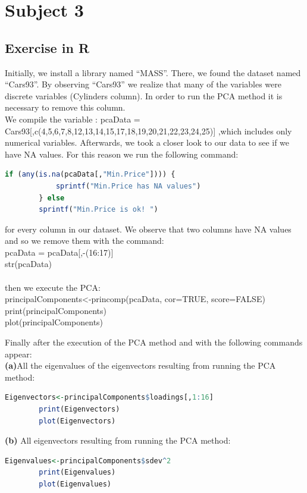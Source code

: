 \documentclass[10pt,a4paper]{article}
\begin{document}
	\section{Subject 3}
	\subsection{Exercise in R}
	Initially, we install a library named “MASS”. There, we found the dataset named “Cars93”. By observing “Cars93” we realize that many of the variables were discrete variables (Cylinders column). In order to run the PCA method it is necessary to remove this column.
	\\We compile the variable :
	pcaData = Cars93[,c(4,5,6,7,8,12,13,14,15,17,18,19,20,21,22,23,24,25)]
	,which includes only numerical variables. Afterwards, we took a closer look to our data to see if we have NA
	values. For this reason we run the following command:
	\begin{lstlisting}[language=R]
		if (any(is.na(pcaData[,"Min.Price"]))) {
			sprintf("Min.Price has NA values")
		} else
		sprintf("Min.Price is ok! ")
	\end{lstlisting}
	
	for every column in our dataset. We observe that two columns have NA values and so we remove them with the command:
	\\pcaData = pcaData[,-(16:17)]
	\\str(pcaData)
	\\
	\\
	then we execute the PCA:
	\\principalComponents<-princomp(pcaData, cor=TRUE, score=FALSE)
	\\print(principalComponents)
	\\plot(principalComponents)
	
	Finally after the execution of the PCA method and with the following commands appear:
	\\
	\textbf{(a)}All the eigenvalues ​​of the eigenvectors resulting from running the PCA method:
	\begin{lstlisting}[language=R]
		Eigenvectors<-principalComponents$loadings[,1:16]
		print(Eigenvectors)
		plot(Eigenvectors)
	\end{lstlisting}
	
	\textbf{(b)} All eigenvectors resulting from running the PCA method:
	\\	\begin{lstlisting}[language=R]
		Eigenvalues<-principalComponents$sdev^2
		print(Eigenvalues)
		plot(Eigenvalues)
	\end{lstlisting}
	
\end{document}
